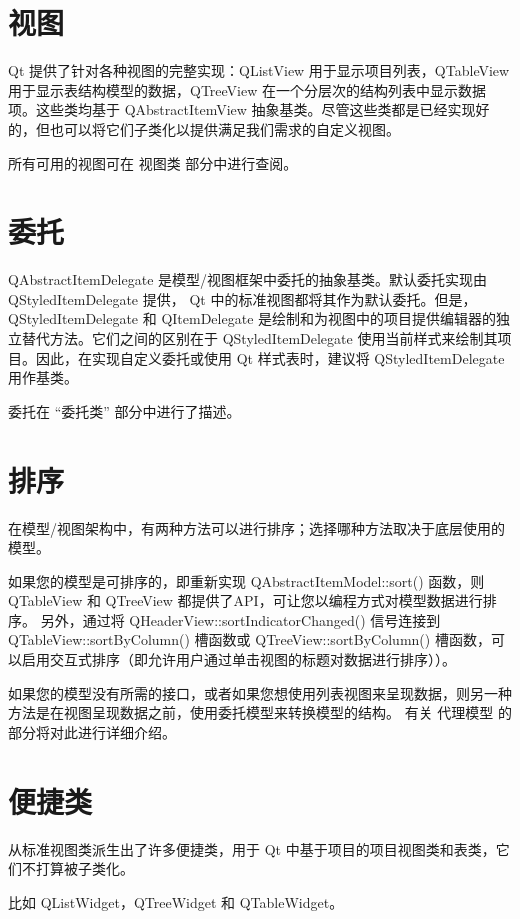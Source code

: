\section{视图}

Qt 提供了针对各种视图的完整实现：QListView 用于显示项目列表，QTableView 用于显示表结构模型的数据，QTreeView 在一个分层次的结构列表中显示数据项。这些类均基于 QAbstractItemView 抽象基类。尽管这些类都是已经实现好的，但也可以将它们子类化以提供满足我们需求的自定义视图。


所有可用的视图可在 视图类 部分中进行查阅。

\section{委托}

QAbstractItemDelegate 是模型/视图框架中委托的抽象基类。默认委托实现由 QStyledItemDelegate 提供， Qt 中的标准视图都将其作为默认委托。但是，QStyledItemDelegate 和 QItemDelegate 是绘制和为视图中的项目提供编辑器的独立替代方法。它们之间的区别在于 QStyledItemDelegate 使用当前样式来绘制其项目。因此，在实现自定义委托或使用 Qt 样式表时，建议将 QStyledItemDelegate 用作基类。


委托在 “委托类” 部分中进行了描述。

\section{排序}

在模型/视图架构中，有两种方法可以进行排序；选择哪种方法取决于底层使用的模型。


如果您的模型是可排序的，即重新实现 QAbstractItemModel::sort() 函数，则 QTableView 和 QTreeView 都提供了API，可让您以编程方式对模型数据进行排序。 另外，通过将 QHeaderView::sortIndicatorChanged() 信号连接到 QTableView::sortByColumn() 槽函数或 QTreeView::sortByColumn() 槽函数，可以启用交互式排序（即允许用户通过单击视图的标题对数据进行排序））。


如果您的模型没有所需的接口，或者如果您想使用列表视图来呈现数据，则另一种方法是在视图呈现数据之前，使用委托模型来转换模型的结构。 有关 代理模型 的部分将对此进行详细介绍。

\section{便捷类}

从标准视图类派生出了许多便捷类，用于 Qt 中基于项目的项目视图类和表类，它们不打算被子类化。

比如 QListWidget，QTreeWidget 和 QTableWidget。

